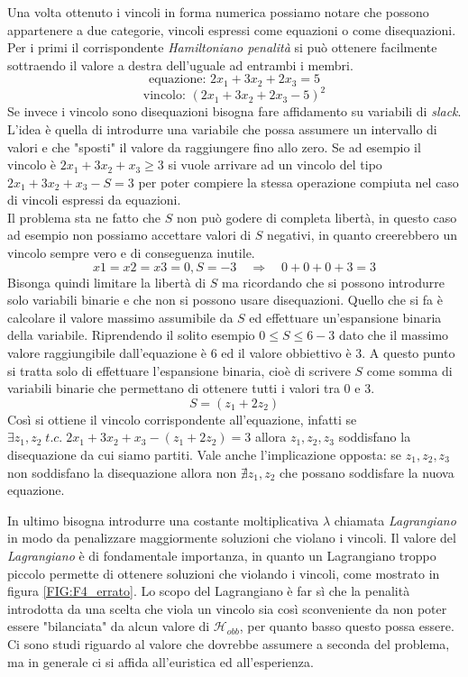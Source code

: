 \documentclass[a4paper]{article}
\begin{document}
Una volta ottenuto i vincoli in forma numerica possiamo notare che possono appartenere a due categorie, vincoli espressi come equazioni o come disequazioni.\\
Per i primi il corrispondente \textit{Hamiltoniano penalità} si può ottenere facilmente sottraendo il valore a destra dell'uguale ad entrambi i membri.
$$\text{equazione: } 2x_1 + 3x_2 + 2x_3 = 5 $$
$$\text{vincolo: } (2x_1 + 3x_2 + 2x_3 -5)^2 $$
Se invece i vincolo sono disequazioni bisogna fare affidamento su variabili di \textit{slack}.\\
L'idea è quella di introdurre una variabile che possa assumere un intervallo di valori e che "sposti" il valore da raggiungere fino allo zero.
Se ad esempio il vincolo è $2x_1 + 3x_2 + x_3 \geq 3 $ si vuole arrivare ad un vincolo del tipo $2x_1 + 3x_2 + x_3 - S =3 $ per poter compiere la stessa operazione compiuta nel caso di vincoli espressi da equazioni.\\
Il problema sta ne fatto che $S$ non può godere di completa libertà, in questo caso ad esempio non possiamo accettare valori di $S$ negativi, in quanto creerebbero un vincolo sempre vero e di conseguenza inutile.
$$ x1=x2=x3=0, S= -3 \quad \Rightarrow \quad 0 + 0 + 0 + 3 = 3 $$
Bisonga quindi limitare la libertà di $S$ ma ricordando che si possono introdurre solo variabili binarie e che non si possono usare disequazioni.
Quello che si fa è calcolare il valore massimo assumibile da $S$ ed effettuare un'espansione binaria della variabile.
Riprendendo il solito esempio $0 \leq S \leq 6-3$ dato che il massimo valore raggiungibile dall'equazione è 6 ed il valore obbiettivo è 3.
A questo punto si tratta solo di effettuare l'espansione binaria, cioè di scrivere $S$ come somma di variabili binarie che permettano di ottenere tutti i valori tra 0 e 3.
$$ S = (z_1 + 2z_2) $$
Così si ottiene il vincolo corrispondente all'equazione, infatti se $\exists z_1,z_2 \; t.c. \; 2x_1 + 3x_2 + x_3 - (z_1 + 2z_2)=3 $ allora $z_1,z_2,z_3$ soddisfano la disequazione da cui siamo partiti.
Vale anche l'implicazione opposta: se $z_1,z_2,z_3$ non soddisfano la disequazione allora non $\nexists z_1,z_2$ che possano soddisfare la nuova equazione.

In ultimo bisogna introdurre una costante moltiplicativa $\lambda$ chiamata \textit{Lagrangiano} in modo da penalizzare maggiormente soluzioni che violano i vincoli.
Il valore del \textit{Lagrangiano} è di fondamentale importanza, in quanto un Lagrangiano troppo piccolo permette di ottenere soluzioni che violando i vincoli, come mostrato in figura \ref{FIG:F4_errato}. %
Lo scopo del Lagrangiano è far sì che la penalità introdotta da una scelta che viola un vincolo sia così sconveniente da non poter essere "bilanciata" da alcun valore di $\mathcal{H}_{obb}$, per quanto basso questo possa essere.
Ci sono studi riguardo al valore che dovrebbe assumere a seconda del problema, ma in generale ci si affida all'euristica ed all'esperienza.
\newpage
\end{document}
